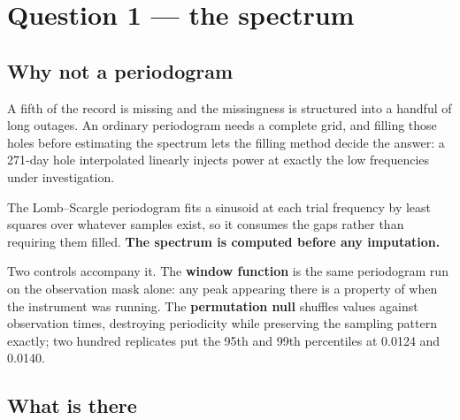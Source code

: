 \documentclass[11pt,a4paper]{article}
\begin{document}

\section{Question 1 --- the spectrum}

\subsection{Why not a periodogram}

A fifth of the record is missing and the missingness is structured into a handful
of long outages. An ordinary periodogram needs a complete grid, and filling those
holes before estimating the spectrum lets the filling method decide the answer: a
271-day hole interpolated linearly injects power at exactly the low frequencies
under investigation.

The Lomb--Scargle periodogram fits a sinusoid at each trial frequency by least
squares over whatever samples exist, so it consumes the gaps rather than
requiring them filled. \textbf{The spectrum is computed before any imputation.}

Two controls accompany it. The \textbf{window function} is the same periodogram
run on the observation mask alone: any peak appearing there is a property of when
the instrument was running. The \textbf{permutation null} shuffles values against
observation times, destroying periodicity while preserving the sampling pattern
exactly; two hundred replicates put the 95th and 99th percentiles at 0.0124 and
0.0140.

\subsection{What is there}
\end{document}
